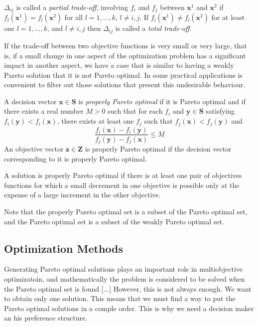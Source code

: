 {$\Delta_{ij}$ is called a \emph{partial trade-off}, involving $f_i$ and $f_j$ between $\mathbf{x}^1$ and $\mathbf{x}^2$ if $f_l(\mathbf{x}^1) = f_l(\mathbf{x}^2)$ for all $l = 1, \ldots, k$, $l \neq i, j$. If $f_l(\mathbf{x}^1) \neq f_l(\mathbf{x}^2)$ for at least one $l = 1, \ldots, k$, and $l \neq i, j$ then $\Delta_{ij}$ is called a \emph{total trade-off}.

If the trade-off between two objective functions is very small or very large, that is, if a small change in one aspect of the optimization problem has a significant impact in another aspect, we have a case that is similar to having a weakly Pareto solution that it is not Pareto optimal. In some practical applications is convenient to filter out those solutions that present this undesirable behaviour.

\begin{definition}
A decision vector $\mathbf{x} \in \mathbf{S}$ is \emph{properly Pareto optimal} if it is Pareto optimal and if there exists a real number $M > 0$ such that for each $f_i$ and $\mathbf{y} \in \mathbf{S}$ satisfying $f_i ( \mathbf{y} ) < f_i ( \mathbf{x} )$, there exists at least one $f_j$ such that $f_j ( \mathbf{x} ) < f_j ( \mathbf{y} )$ and
\[
\frac{f_i ( \mathbf{x} ) - f_i ( \mathbf{y} )}{f_j ( \mathbf{y} ) - f_j ( \mathbf{x} )} \leq M
\]
An objective vector $\mathbf{z} \in \mathbf{Z}$ is properly Pareto optimal if the decision vector corresponding to it is properly Pareto optimal.
\end{definition}

A solution is properly Pareto optimal if there is at least one pair of objectives functions for which a small decrement in one objective is possible only at the expense of a large increment in the other objective.

Note that the properly Pareto optimal set is a subset of the Pareto optimal set, and the Pareto optimal set is a subset of the weakly Pareto optimal set.


\subsection{Optimization Methods}

{\color{red} Generating Pareto optimal solutions plays an important role in multiobjective optimizatoin, and mathematically the problem is considered to be solved when the Pareto optimal set is found [...] However, this is not always enough. We want to obtain only one solution. This means that we must find a way to put the Pareto optimal solutions in a comple order. This is why we need a decision maker an his preference structure.}

}
